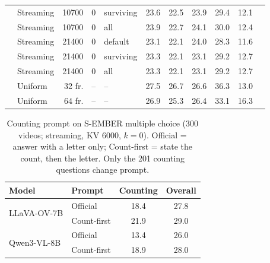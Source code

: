 \begin{table}[t]
\begin{tabular}{llrclcccccc}
 & Streaming & 10700 & 0 & surviving & 23.6 & 22.5 & 23.9 & 29.4 & 12.1 \\
 & Streaming & 10700 & 0 & all & 23.9 & 22.7 & 24.1 & 30.0 & 12.4 \\
 & Streaming & 21400 & 0 & default & 23.1 & 22.1 & 24.0 & 28.3 & 11.6 \\
 & Streaming & 21400 & 0 & surviving & 23.3 & 22.1 & 23.1 & 29.2 & 12.7 \\
 & Streaming & 21400 & 0 & all & 23.3 & 22.1 & 23.1 & 29.2 & 12.7 \\
 & Uniform & 32 fr. & -- & -- & 27.5 & 26.7 & 26.6 & 36.3 & 13.0 \\
 & Uniform & 64 fr. & -- & -- & 26.9 & 25.3 & 26.4 & 33.1 & 16.3 \\
\bottomrule
\end{tabular}
\end{table}

\begin{table}[t]
\centering
\small
\caption{Counting prompt on S-EMBER multiple choice (300 videos; streaming, KV 6000, $k{=}0$). Official = answer with a letter only; Count-first = state the count, then the letter. Only the 201 counting questions change prompt.}
\label{tab:sember-count-prompt-v300}
\begin{tabular}{llcc}
\toprule
Model & Prompt & Counting & Overall \\
\midrule
\multirow{2}{*}{LLaVA-OV-7B} & Official & 18.4 & 27.8 \\
 & Count-first & 21.9 & 29.0 \\
\midrule
\multirow{2}{*}{Qwen3-VL-8B} & Official & 13.4 & 26.0 \\
 & Count-first & 18.9 & 28.0 \\
\bottomrule
\end{tabular}
\end{table}

